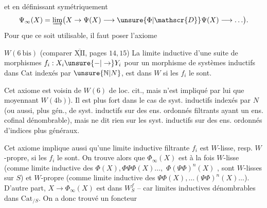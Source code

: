 
et en définissant symétriquement
\[
\Psi_\infty(X)=\underrightarrow{\lim}\bigl(X\to\Psi(X)\longrightarrow\unsure{\Phi|\mathscr{D}}\Psi(X)\longrightarrow\ldots\bigr).
\]
Pour que ce soit utilisable, il faut poser l'axiome

\uline{$W(6\ \mathrm{bis})$} (comparer $\overline{\underline{\mathrm{XII}}}$, pages $14,15$) La limite inductive d'une suite de morphismes $f_i:X_i\unsure{\mathbin{-}|\to}Y_i$  pour un morphisme de systèmes inductifs dans $\mathrm{Cat}$ indexés par $\unsure{\mathbb N|N}$, est dans $W$ si les $f_i$ le sont.

Cet axiome est voisin de $W(6)$ de loc. cit., mais n'est impliqué par lui que moyennant $W(4\mathrm b)$). Il est plus fort dans le cas de syst. inductifs indexés par $N$ (ou aussi, plus gén., de syst. inductifs sur des ens. ordonnés filtrants ayant un ens. cofinal dénombrable), mais ne dit rien sur les syst. inductifs sur des ens. ordonnés d'indices plus généraux.

Cet axiome implique aussi qu'une limite inductive filtrante    $f_i$ est $W$-lisse, resp. $W$-propre, si les $f_i$ le sont.  On trouve alors que $\Phi_\infty(X)$ est à la fois $W$-lisse (comme limite inductive des $\Phi(X),\Phi\Psi\Phi(X)\ldots,$ $\Phi(\Psi\Phi)^n(X)$ ,   sont $W$-lisses sur $S$) et $W$-propre (comme limite inductive des $\Psi\Phi(X),\ldots(\Psi\Phi)^n(X)\ldots$).  D'autre part, $X\longrightarrow\Phi_\infty(X)$ est dans $W_S^f$ -- car   limites inductives  dénombrables dans $\mathrm{Cat}_{/S}$. On a donc trouvé un foncteur
